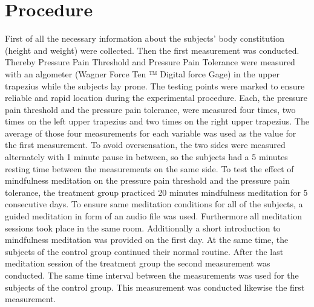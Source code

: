 \section{Procedure}
First of all the necessary information about the subjects’ body constitution (height and weight) were collected. 
Then the first measurement was conducted. Thereby Pressure Pain Threshold and Pressure Pain Tolerance were measured with an algometer (Wagner Force Ten ™  Digital force Gage)  in the upper trapezius while the subjects lay prone. The testing points were marked to ensure reliable and rapid location during the experimental procedure. Each, the pressure pain threshold and the pressure pain tolerance, were measured four times, two times on the left upper trapezius and two times on the right  upper trapezius. The average of those four measurements for each variable was used as the value for the first measurement. To avoid oversensation, the two sides were measured alternately with 1 minute pause in between, so  the subjects had a 5 minutes resting time between the measurements on the same side.  
To test the effect of mindfulness meditation on the pressure pain threshold and the pressure pain tolerance, the treatment group practiced 20 minutes mindfulness meditation for 5 consecutive days. To ensure same meditation conditions for all of the subjects, a guided meditation in form of an audio file was used. Furthermore all meditation sessions took place in the same room. Additionally a short introduction to mindfulness meditation was provided on the first day.
At the same time, the subjects of the control group continued their normal routine.
After the last meditation session of the treatment group the second measurement was conducted. The same time interval between the measurements was used for the subjects of the control group. This measurement was conducted likewise the first measurement.


